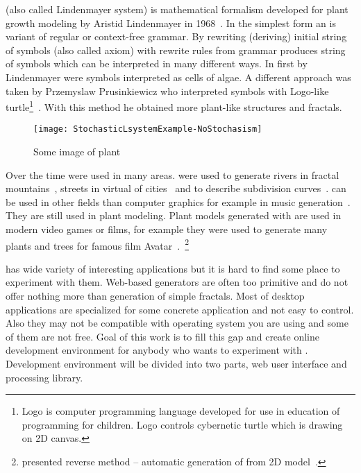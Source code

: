 

\lsystem (also called Lindenmayer system) is mathematical formalism developed for plant growth modeling by Aristid Lindenmayer in 1968~\cite{Lin68}.
In the simplest form an \lsystem is variant of regular or \mbox{context-free} grammar.
By rewriting (deriving) initial string of symbols (also called axiom) with rewrite rules from grammar \lsystem produces string of symbols which can be interpreted in many different ways.
In first \lsystems by Lindenmayer were symbols interpreted as cells of algae.
A different approach was taken by Przemyslaw Prusinkiewicz who interpreted \lsystem symbols with \mbox{Logo-like} turtle\footnote{
	Logo is computer programming language developed for use in education of programming for children.
	Logo controls cybernetic turtle which is drawing on 2D canvas.}~\cite{Pru85}.
With this method he obtained more plant-like structures and fractals.~\cite{CD93}

\begin{wrapfigure}{r}{0.42\textwidth}
	\vspace{-20pt}
	\begin{center}
	\texttt{[image: StochasticLsystemExample-NoStochasism]}
	\end{center}
	\caption{Some image of plant}
\end{wrapfigure}

Over the time \lsystems were used in many areas.
\lsystems were used to generate rivers in fractal mountains~\cite{PH93}, streets in virtual of cities~\cite{PM01} and to describe subdivision curves~\cite{PSSK03}.
\lsystems can be used in other fields than computer graphics for example in music generation~\cite{HCJ99, Man06}.
They are still used in plant modeling.
Plant models generated with \lsystems are used in modern video games or films, for example they were used to generate many plants and trees for famous film Avatar~\cite{Wor08, Dun10}.~\footnote{\citeauthor{SBM10} presented reverse method -- automatic generation of \lsystems from 2D model~\cite{SBM10}.}

\lsystems has wide variety of interesting applications but it is hard to find some place to experiment with them.
Web-based \lsystem generators are often too primitive and do not offer nothing more than generation of simple fractals.
Most of desktop applications are specialized for some concrete \lsystem application and not easy to control.
Also they may not be compatible with operating system you are using and some of them are not free.
Goal of this work is to fill this gap and create online development environment for anybody who wants to experiment with \lsystems.
Development environment will be divided into two parts, web user interface and \lsystem processing library.


